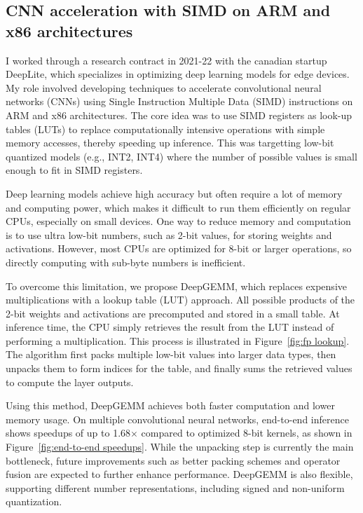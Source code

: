 \documentclass[11pt]{report}
\begin{document}
\subsection{CNN acceleration with SIMD on ARM and x86 architectures}

I worked through a research contract in 2021-22 with the canadian startup DeepLite, which specializes in optimizing deep learning models for edge devices. My role involved developing techniques to accelerate convolutional neural networks (CNNs) using Single Instruction Multiple Data (SIMD) instructions on ARM and x86 architectures. The core idea was to use SIMD registers as look-up tables (LUTs) to replace computationally intensive operations with simple memory accesses, thereby speeding up inference. This was targetting low-bit quantized models (e.g., INT2, INT4) where the number of possible values is small enough to fit in SIMD registers.

Deep learning models achieve high accuracy but often require a lot of memory and computing power, which makes it difficult to run them efficiently on regular CPUs, especially on small devices. One way to reduce memory and computation is to use ultra low-bit numbers, such as 2-bit values, for storing weights and activations. However, most CPUs are optimized for 8-bit or larger operations, so directly computing with sub-byte numbers is inefficient.

To overcome this limitation, we propose DeepGEMM, which replaces expensive multiplications with a lookup table (LUT) approach. All possible products of the 2-bit weights and activations are precomputed and stored in a small table. At inference time, the CPU simply retrieves the result from the LUT instead of performing a multiplication. This process is illustrated in Figure~\ref{fig:fp lookup}. The algorithm first packs multiple low-bit values into larger data types, then unpacks them to form indices for the table, and finally sums the retrieved values to compute the layer outputs.

Using this method, DeepGEMM achieves both faster computation and lower memory usage. On multiple convolutional neural networks, end-to-end inference shows speedups of up to 1.68$\times$ compared to optimized 8-bit kernels, as shown in Figure~\ref{fig:end-to-end speedups}. While the unpacking step is currently the main bottleneck, future improvements such as better packing schemes and operator fusion are expected to further enhance performance. DeepGEMM is also flexible, supporting different number representations, including signed and non-uniform quantization.
\end{document}
